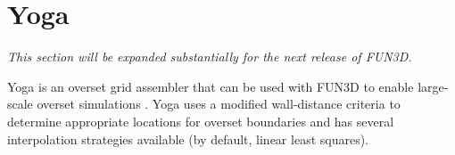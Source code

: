 \section{Yoga}\label{s:yoga}
\emph{This section will be expanded substantially for the next release of FUN3D.}

Yoga is an overset grid assembler \cite{druyor-phd-thesis-overset} that can be used with FUN3D
to enable large-scale overset simulations \cite{druyor-overset-scaling}. 
Yoga uses a modified wall-distance criteria to determine appropriate locations for 
overset boundaries and has several interpolation strategies available (by default, linear least squares).


